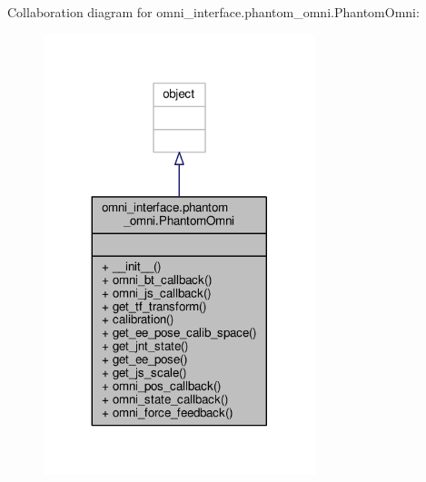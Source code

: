 Collaboration diagram for omni\-\_\-interface.\-phantom\-\_\-omni.\-Phantom\-Omni\-:
\nopagebreak
\begin{figure}[H]
\begin{center}
\leavevmode
\includegraphics[width=224pt]{classomni__interface_1_1phantom__omni_1_1_phantom_omni__coll__graph}
\end{center}
\end{figure}
